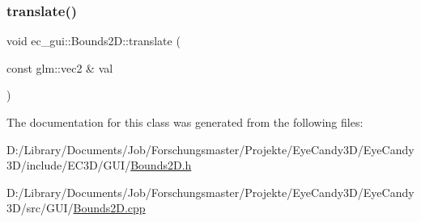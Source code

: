 \subsubsection{\texorpdfstring{translate()}{translate()}}
{\footnotesize\ttfamily void ec\+\_\+gui\+::\+Bounds2\+D\+::translate (\begin{DoxyParamCaption}\item[{const glm\+::vec2 \&}]{val }\end{DoxyParamCaption})}



The documentation for this class was generated from the following files\+:\begin{DoxyCompactItemize}
\item 
D\+:/\+Library/\+Documents/\+Job/\+Forschungsmaster/\+Projekte/\+Eye\+Candy3\+D/\+Eye\+Candy3\+D/include/\+E\+C3\+D/\+G\+U\+I/\mbox{\hyperlink{_bounds2_d_8h}{Bounds2\+D.\+h}}\item 
D\+:/\+Library/\+Documents/\+Job/\+Forschungsmaster/\+Projekte/\+Eye\+Candy3\+D/\+Eye\+Candy3\+D/src/\+G\+U\+I/\mbox{\hyperlink{_bounds2_d_8cpp}{Bounds2\+D.\+cpp}}\end{DoxyCompactItemize}
